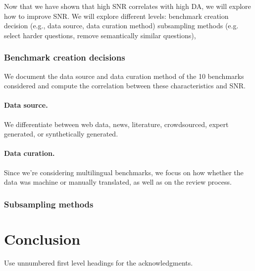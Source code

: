 \documentclass{article}
\begin{document}
Now that we have shown that high SNR correlates with high DA, we will explore how to improve SNR.
We will explore different levels:
benchmark creation decision (e.g., data source, data curation method)
subsampling methods (e.g. select harder questions, remove semantically similar questions),


\subsubsection{Benchmark creation decisions}

We document the data source and data curation method of the 10 benchmarks considered and compute the correlation between these characteristics and SNR.

\paragraph{Data source.} We differentiate between web data, news, literature, crowdsourced, expert generated, or synthetically generated.

\paragraph{Data curation.} Since we're considering multilingual benchmarks, we focus on how whether the data was machine or manually translated, as well as on the review process.

\subsubsection{Subsampling methods}




\section{Conclusion}
\label{sec:conclusion}


\begin{ack}
Use unnumbered first level headings for the acknowledgments.
\end{ack}







\appendix







\newpage
\end{document}
